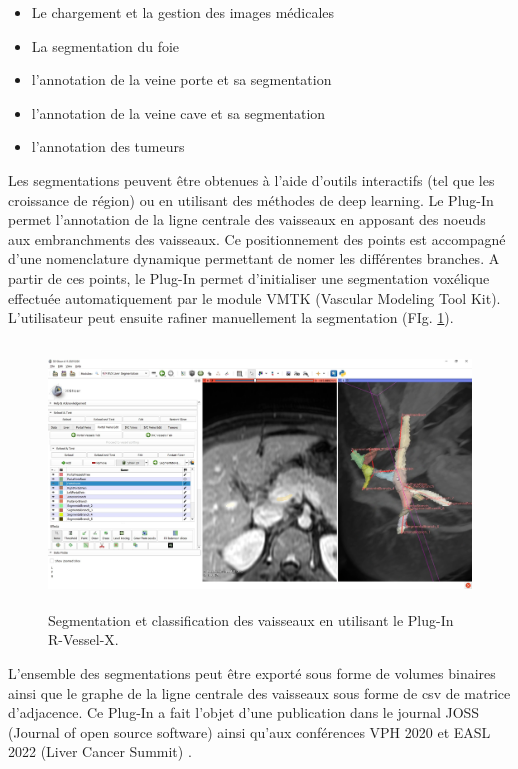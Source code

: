 \begin{itemize}
    \item Le chargement et la gestion des images médicales
    \item La segmentation du foie 
    \item l'annotation de la veine porte et sa segmentation
    \item l'annotation de la veine cave et sa segmentation
    \item l'annotation des tumeurs
\end{itemize}

Les segmentations peuvent être obtenues à l'aide d'outils interactifs (tel que les croissance de région) ou en utilisant des méthodes de deep learning. 
Le Plug-In permet l'annotation de la ligne centrale des vaisseaux en apposant des noeuds aux embranchments des vaisseaux. Ce positionnement des points est accompagné d'une nomenclature dynamique permettant de nomer les différentes branches. A partir de ces points, le Plug-In permet d'initialiser une segmentation voxélique effectuée automatiquement par le module VMTK (Vascular Modeling Tool Kit). L'utilisateur peut ensuite rafiner manuellement la segmentation (FIg. \ref{fig:slicer_plug_in}).

\begin{figure}[H]
    \includegraphics[height=7cm]{Images/plug_in_segmentation.png}
    \caption{Segmentation et classification des vaisseaux en utilisant le Plug-In R-Vessel-X.}
    \label{fig:slicer_plug_in}
\end{figure}

L'ensemble des segmentations peut être exporté sous forme de volumes binaires ainsi que le graphe de la ligne centrale des vaisseaux sous forme de csv de matrice d'adjacence.
Ce Plug-In a fait l'objet d'une publication dans le journal JOSS (Journal of open source software) \cite{Lamy2022_JOSS} ainsi qu'aux conférences VPH 2020 \cite{Lamy2020_VPH_plugin} et EASL 2022 (Liver Cancer Summit) \cite{Lamy2022_EASL}.




